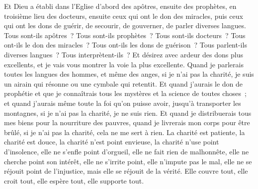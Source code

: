 \begin{multicols}{2}
Et Dieu a établi dans l'Eglise d'abord des apôtres, ensuite des prophètes, en troisième lieu des docteurs, ensuite ceux qui ont le don des miracles, puis ceux qui ont les dons de guérir, de secourir, de gouverner, de parler diverses langues.
Tous sont-ils apôtres~? Tous sont-ils prophètes~? Tous sont-ils docteurs~? Tous ont-ils le don des miracles~?
Tous ont-ils les dons de guérison~? Tous parlent-ils diverses langues~? Tous interprètent-ils~?
Et désirez avec ardeur des dons plus excellents, et je vais vous montrer la voie la plus excellente.
\VerseOne{}Quand je parlerais toutes les langues des hommes, et même des anges, si je n'ai pas la charité, je suis un airain qui résonne ou une cymbale qui retentit.
Et quand j'aurais le don de prophétie et que je connaîtrais tous les mystères et la science de toutes choses~; et quand j'aurais même toute la foi qu'on puisse avoir, jusqu'à transporter les montagnes, si je n'ai pas la charité, je ne suis rien.
Et quand je distribuerais tous mes biens pour la nourriture des pauvres, quand je livrerais mon corps pour être brûlé, si je n'ai pas la charité, cela ne me sert à rien.
La charité est patiente, la charité est douce, la charité n'est point envieuse, la charité n'use point d'insolence, elle ne s'enfle point d'orgueil,
elle ne fait rien de malhonnête, elle ne cherche point son intérêt, elle ne s'irrite point, elle n'impute pas le mal,
elle ne se réjouit point de l'injustice, mais elle se réjouit de la vérité.
Elle couvre tout, elle croit tout, elle espère tout, elle supporte tout.

\end{multicols}
